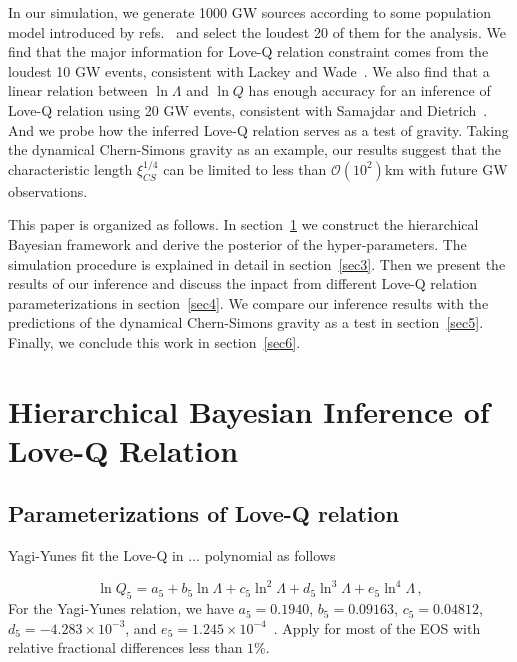 \documentclass[a4paper,11pt]{article}
\begin{document}
In our simulation, we generate 1000 GW sources according to some population model introduced by refs.~\cite{Fishbach:2018edt, Farrow:2019xnc, Samajdar:2020xrd} and select the loudest 20 of them for the analysis. We find that the major information for Love-Q relation constraint comes from the loudest 10 GW events, consistent with Lackey and Wade~\cite{Lackey:2014fwa}. We also find that a linear relation between $\ln\Lambda$ and $\ln Q$ has enough accuracy for an inference of Love-Q relation using 20 GW events, consistent with Samajdar and Dietrich~\cite{Samajdar:2020xrd}. And we probe how the inferred Love-Q relation serves as a test of gravity. Taking the dynamical Chern-Simons gravity as an example, our results suggest that the characteristic length $\xi_{CS}^{1/4}$ can be limited to less than $\mathcal{O}(10^2)$km with future GW observations. 

This paper is organized as follows. In section~\ref{sec2} we construct the hierarchical Bayesian framework and derive the posterior of the hyper-parameters. The simulation procedure is explained in detail in section~\ref{sec3}. Then we present the results of our inference and discuss the inpact from different Love-Q relation parameterizations in section~\ref{sec4}. We compare our inference results with the predictions of the dynamical Chern-Simons gravity as a test in section~\ref{sec5}. Finally, we conclude this work in section~\ref{sec6}.


\section{Hierarchical Bayesian Inference of Love-Q Relation}
\label{sec2}

\subsection{Parameterizations of Love-Q relation} 
\label{sec2_1}
Yagi-Yunes fit the Love-Q in ... polynomial as follows


\begin{equation}
\label{5-d_Love_Q_eq}
    \ln Q_{5}=a_5 + b_5 \ln \Lambda + c_5 \ln^2\Lambda + d_5 \ln^3\Lambda + e_5 \ln^4 \Lambda\,,
\end{equation}
For the Yagi-Yunes relation, we have $a_5=0.1940$, $b_5=0.09163$, $c_5=0.04812$, 
$d_5=-4.283\times10^{-3}$, and $e_5=1.245\times10^{-4}$~\cite{Yagi_2017}. Apply for most of the EOS with relative fractional differences less than $1\%$.
\end{document}
